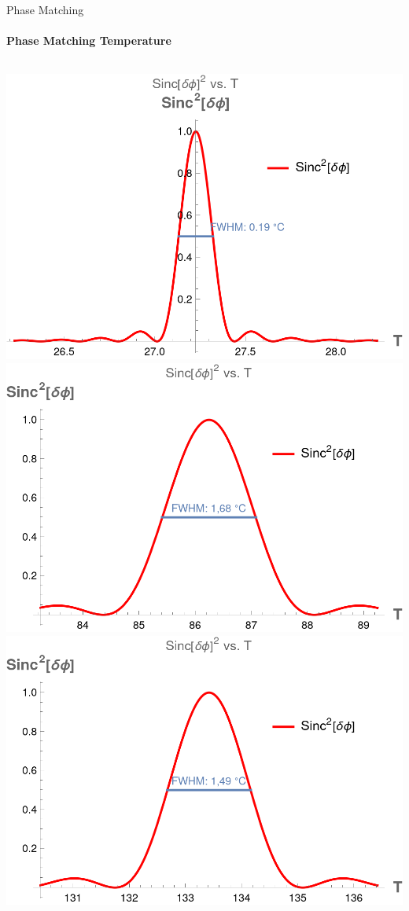 \documentclass[serif,8pt]{beamer}
\begin{document}
\begin{frame}{Phase Matching}
	\framesubtitle{Phase Matching Temperature}
    \begin{columns}[t]
        \includegraphics[width=0.8\columnwidth]{PMT_Type2.png}
        \includegraphics[width=0.8\columnwidth]{PMT_Type0G5.png}
        \includegraphics[width=0.8\columnwidth]{PMT_Type0G4.png}

\end{columns}
\end{frame}
\end{document}
